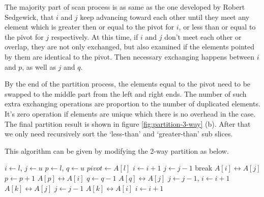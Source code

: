 \documentclass[UTF8]{article}
\begin{document}
The majority part of scan process is as same as the one developed by Robert Sedgewick, that
$i$ and $j$ keep advancing toward each other until they meet any element which is greater then or equal
to the pivot for $i$, or less than or equal to the pivot for $j$ respectively.
At this time, if $i$ and $j$ don't meet each other or overlap, they are not only
exchanged, but also examined if the elements pointed by them are identical to the pivot.
Then necessary exchanging happens between $i$ and $p$, as well as $j$ and $q$.

By the end of the partition process, the elements equal to the pivot need to be swapped to the middle
part from the left and right ends. The number of such extra exchanging operations are proportion to the
number of duplicated elements. It's zero operation if elements are unique which there is no overhead
in the case. The final partition result is shown in figure \ref{fig:partition-3-way} (b). After that
we only need recursively sort the `less-than' and `greater-than' sub slices.

This algorithm can be given by modifying the 2-way partition as below.

\begin{algorithmic}[1]
    \State $i \gets l$, $j \gets u$
    \State $p \gets l$, $q \gets u$ 
    \State $pivot \gets A[l]$
    \Loop
      \Repeat
        \State $i \gets i + 1$
       
      \Repeat
        \State $j \gets j - 1$
       
        \State break 
      \EndIf
      \State {} $A[i] \leftrightarrow A[j]$
       
        \State $p \gets p + 1$
        \State {} $A[p] \leftrightarrow A[i]$
      \EndIf
        \State $q \gets q - 1$
        \State {} $A[q] \leftrightarrow A[j]$
      \EndIf
    \EndLoop
     
      \State $j \gets j - 1$, $i \gets i + 1$
    \EndIf
     
      \State {} $A[k] \leftrightarrow A[j]$
      \State $j \gets j - 1$
    \EndFor
      \State {} $A[k] \leftrightarrow A[i]$
      \State $i \gets i + 1$
    \EndFor
    \State {}
    \State {}
  \EndIf
\EndProcedure
\end{algorithmic}
\end{document}
